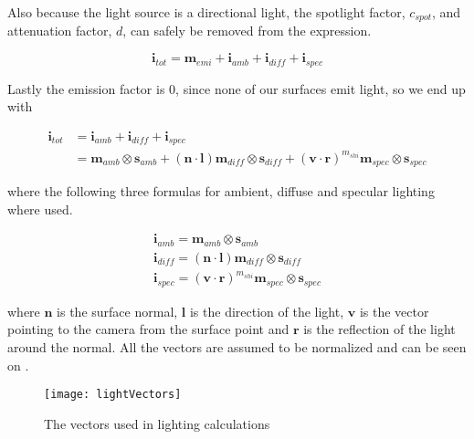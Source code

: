 Also because the light source is a directional light, the spotlight
factor, $c_{spot}$, and attenuation factor, $d$, can safely be
removed from the expression.

\begin{displaymath}
  \mathbf{i}_{tot} = \mathbf{m}_{emi} + \mathbf{i}_{amb} + \mathbf{i}_{diff} + \mathbf{i}_{spec}
\end{displaymath}

Lastly the emission factor is 0, since none of our surfaces emit
light, so we end up with

\begin{displaymath}
  \begin{array}{rl}
    \mathbf{i}_{tot} &= \mathbf{i}_{amb} + \mathbf{i}_{diff} +
    \mathbf{i}_{spec}\\
    &= \mathbf{m}_{amb} \otimes \mathbf{s}_{amb} + (\mathbf{n} \cdot
    \mathbf{l}) \mathbf{m}_{diff} \otimes \mathbf{s}_{diff} +
    (\mathbf{v} \cdot \mathbf{r})^{m_{shi}} \mathbf{m}_{spec} \otimes
    \mathbf{s}_{spec} 
  \end{array}
\end{displaymath}

where the following three formulas for ambient, diffuse and specular
lighting where used.

\begin{displaymath}
  \begin{array}{c}
    \mathbf{i}_{amb} = \mathbf{m}_{amb} \otimes \mathbf{s}_{amb} \\
    \mathbf{i}_{diff} = (\mathbf{n} \cdot \mathbf{l}) \mathbf{m}_{diff} \otimes \mathbf{s}_{diff} \\
    \mathbf{i}_{spec} = (\mathbf{v} \cdot \mathbf{r})^{m_{shi}} \mathbf{m}_{spec} \otimes \mathbf{s}_{spec} 
  \end{array}
\end{displaymath}

where $\mathbf{n}$ is the surface normal, $\mathbf{l}$ is the
direction of the light, $\mathbf{v}$ is the vector pointing to the
camera from the surface point and $\mathbf{r}$ is the reflection of the
light around the normal. All the vectors are assumed to be normalized
and can be seen on .

\begin{figure}
  \centering
  \texttt{[image: lightVectors]}
  \caption{The vectors used in lighting calculations}
  \label{fig:lightVectors}
\end{figure}

